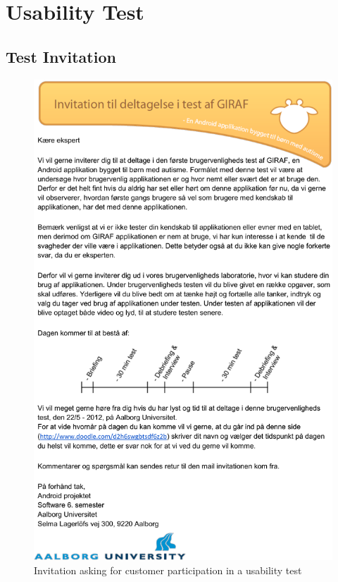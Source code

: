 \chapter{Usability Test}
\label{usability_test}
\section{Test Invitation}
\begin{figure}[h!]
	\centering
	\includegraphics[scale=0.65]{gfx/usabilitytest-invitation.png}
	\caption{Invitation asking for customer participation in a usability test}
	\label{fig:usability_invitation}
\end{figure}

